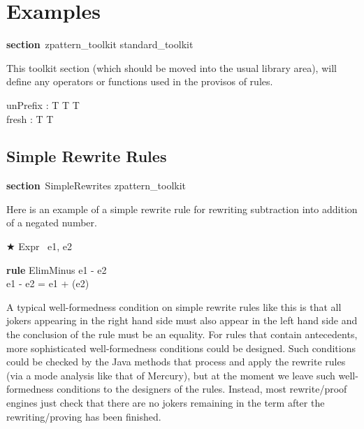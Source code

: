 \documentclass{article}
\newenvironment{zsection}{\begin{zed}}{\end{zed}}
\newcommand{\SECTION}{\textbf{section}~}
\newcommand{\parents}{\mathrel{\textbf{parents}}}
\newenvironment{zedrule}[1]{\par\textbf{rule }#1\vspace{-2ex}\infrule}{\endinfrule}
\newcommand{\derives}{\derive{}}
\newenvironment{zedjoker}[1]{\par$\bigstar$ #1\ }{}
\newcommand{\HasType}{\mathbin{:}} %
\newcommand{\negate}{\mathop{-}}
\newcommand{\arithmos}{{A\!\!\!\!A}}   %
\newcommand{\proviso}{\raisebox{0.5ex}{${}_{\blacktriangleright}\ $}}%
\begin{document}
\section{Examples}

\begin{zsection}
  \SECTION zpattern\_toolkit \parents standard\_toolkit
\end{zsection}

This toolkit section (which should be moved into the usual
library area), will define any operators or functions used
in the provisos of rules.

\begin{gendef}[T]
  unPrefix : T \cross T \fun T \\
  fresh : T \fun T
\end{gendef}



\subsection{Simple Rewrite Rules}

\begin{zsection}
  \SECTION SimpleRewrites \parents zpattern\_toolkit
\end{zsection}

Here is an example of a simple rewrite rule
for rewriting subtraction into addition of a negated number.
\begin{zedjoker}{Expr} e1, e2 \end{zedjoker} \\
\begin{zedrule}{ElimMinus}
  \proviso e1 - e2 \HasType \arithmos \\
\derives
  e1 - e2 = e1 + (\negate e2)
\end{zedrule}

A typical well-formedness condition on simple rewrite rules like this
is that all jokers appearing in the right hand side must also
appear in the left hand side and the conclusion of the rule
must be an equality.  For rules that contain antecedents, more 
sophisticated well-formedness conditions could be designed. 
Such conditions could be checked by the
Java methods that process and apply the rewrite rules (via a mode
analysis like that of Mercury), but at the moment we leave such
well-formedness conditions to the designers of the rules.
Instead, most rewrite/proof engines just check that there are no
jokers remaining in the term after the rewriting/proving has been
finished.
\end{document}
